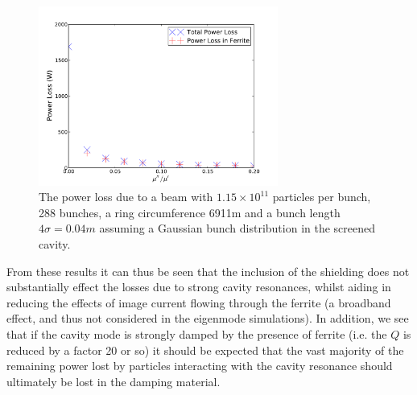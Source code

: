 \begin{figure}
\begin{center}
\includegraphics[width=0.7\textwidth]{Beam_Coupling_Impedance_Reduction_Techniques/figures/screen_loss_tan_vs_power.pdf}
\end{center}
\caption{The power loss due to a beam with $1.15 \times 10^{11}$ particles per bunch, 288 bunches, a ring circumference 6911m and a bunch length $4\sigma = 0.04m$ assuming a Gaussian bunch distribution in the screened cavity.}
\label{fig:screen_loss_tan_v_power}
\end{figure}

From these results it can thus be seen that the inclusion of the shielding does not substantially effect the losses due to strong cavity resonances, whilst aiding in reducing the effects of image current flowing through the ferrite (a broadband effect, and thus not considered in the eigenmode simulations). In addition, we see that if the cavity mode is strongly damped by the presence of ferrite (i.e. the $Q$ is reduced by a factor 20 or so) it should be expected that the vast majority of the remaining power lost by particles interacting with the cavity resonance should ultimately be lost in the damping material. 